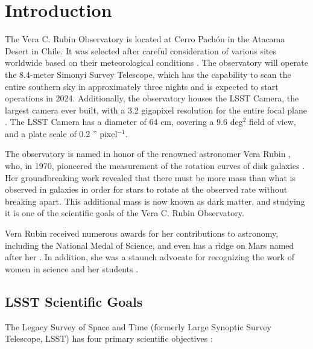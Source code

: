 \section{Introduction} \label{sec:intro}
The Vera C. Rubin Observatory is located at Cerro Pachón in the Atacama Desert in Chile. It was selected after careful consideration of various sites worldwide based on their meteorological conditions \citep{2006SPIE.6267E..1RS}. The observatory will operate the 8.4-meter Simonyi Survey Telescope, which has the capability to scan the entire southern sky in approximately three nights and is expected to start operations in 2024. Additionally, the observatory houses the LSST Camera, the largest camera ever built, with a 3.2 gigapixel resolution for the entire focal plane \citep{10.71929/rubin/2571927}. The LSST Camera has a diameter of 64 cm, covering a 9.6 deg$^2$ field of view, and a plate scale of 0.2 '' pixel$^{-1}$.

\vspace{3mm}
The observatory is named in honor of the renowned astronomer Vera Rubin \citep{NSF_2020}, who, in 1970, pioneered the measurement of the rotation curves of disk galaxies \citep{2011ARA&A..49....1R}. Her groundbreaking work revealed that there must be more mass than what is observed in galaxies in order for stars to rotate at the observed rate without breaking apart. This additional mass is now known as dark matter, and studying it is one of the scientific goals of the Vera C. Rubin Observatory.

\vspace{3mm}
Vera Rubin received numerous awards for her contributions to astronomy, including the National Medal of Science, and even has a ridge on Mars named after her \citep{koren_2020}. In addition, she was a staunch advocate for recognizing the work of women in science and her students \citep{2011ARA&A..49....1R}.

\subsection{LSST Scientific Goals}

The Legacy Survey of Space and Time (formerly Large Synoptic Survey Telescope, LSST) has four primary scientific objectives \citep{2009arXiv0912.0201L, 2019ApJ...873..111I}:

